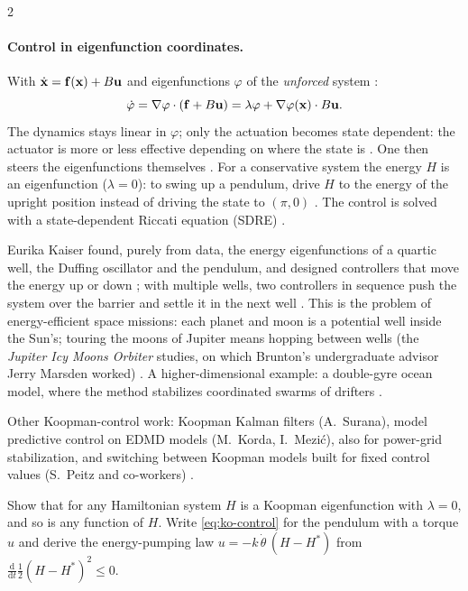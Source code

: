 \begin{paracol}{2}
\paragraph{Control in eigenfunction coordinates.} With $\dot{\mathbf{x}}=\mathbf{f}(\mathbf{x})+B\mathbf{u}$ and eigenfunctions
$\varphi$ of the \emph{unforced} system :
\begin{equation}\label{eq:ko-control}
  \dot\varphi=\nabla\varphi\cdot(\mathbf{f}+B\mathbf{u})=\lambda\varphi+\nabla\varphi(\mathbf{x})\cdot B\mathbf{u} .
\end{equation}
The dynamics stays linear in $\varphi$; only the actuation becomes state dependent: the actuator is more or
less effective depending on where the state is . One then steers the
eigenfunctions themselves . For a conservative system the energy $H$ is an eigenfunction
($\lambda=0$): to swing up a pendulum, drive $H$ to the energy of the upright position instead of driving the
state to $(\pi,0)$ . The control is solved with a state-dependent Riccati equation
(SDRE) .

\begin{application}
Eurika Kaiser found, purely from data, the energy eigenfunctions of a quartic well, the Duffing oscillator and
the pendulum, and designed controllers that move the energy up or down ; with
multiple wells, two controllers in sequence push the system over the barrier and settle it in the next well
. This is the problem of energy-efficient space missions: each planet and moon is a
potential well inside the Sun's; touring the moons of Jupiter means hopping between wells (the \emph{Jupiter
Icy Moons Orbiter} studies, on which Brunton's undergraduate advisor Jerry Marsden worked)
. A higher-dimensional example: a double-gyre ocean model, where
the method stabilizes coordinated swarms of drifters .
\end{application}

Other Koopman-control work: Koopman Kalman filters (A.~Surana), model predictive control on EDMD models (M.~Korda,
I.~Mezi\'c), also for power-grid stabilization, and switching between Koopman models built for fixed
control values (S.~Peitz and co-workers) .

\begin{exercise}
Show that for any Hamiltonian system $H$ is a Koopman eigenfunction with $\lambda=0$, and so is any function of
$H$. Write \eqref{eq:ko-control} for the pendulum with a torque $u$ and derive the energy-pumping law
$u=-k\,\dot\theta\,(H-H^*)$ from $\frac{\mathrm d}{\mathrm dt}\frac12(H-H^*)^2\le0$.
\end{exercise}


\end{paracol}
